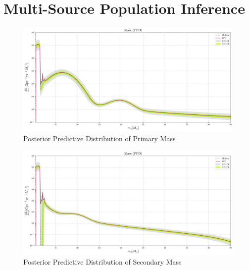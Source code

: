 \documentclass[a0,portrait]{a0poster}
\begin{document}
\begin{multicols}{3}
\begin{frame}
\end{frame}

\columnbreak


\section*{Multi-Source Population Inference}

\begin{frame}

\begin{figure}[H]
    \centering
    \includegraphics[width=0.7\linewidth]{assets/plots/rate_mass_1_source_ppd_plot.pdf}
    \caption{Posterior Predictive Distribution of Primary Mass}
    \label{fig:ppd-m1}
\end{figure}

\begin{figure}[H]
    \centering
    \includegraphics[width=0.7\linewidth]{assets/plots/rate_mass_2_source_ppd_plot.pdf}
    \caption{Posterior Predictive Distribution of Secondary Mass}
    \label{fig:ppd-m2}
\end{figure}


\end{frame}
\end{multicols}
\end{document}
